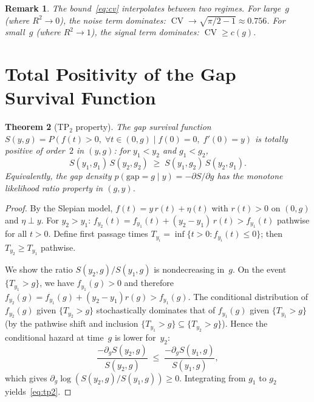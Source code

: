 \documentclass[11pt]{article}
\newtheorem{theorem}{Theorem}
\newtheorem{remark}[theorem]{Remark}
\DeclareMathOperator{\CV}{CV}
\begin{document}
\begin{remark}\label{rem:interpolation}
The bound~\eqref{eq:cv} interpolates between two regimes.
For large~$g$ (where $R^2 \to 0$), the noise term dominates:
$\CV \to \sqrt{\pi/2 - 1} \approx 0.756$.
For small~$g$ (where $R^2 \to 1$), the signal term dominates:
$\CV \geq c(g)$.
\end{remark}


\section{Total Positivity of the Gap Survival Function}\label{sec:tp2}

\begin{theorem}[TP$_2$ property]\label{thm:tp2}
The gap survival function
$S(y, g) = P(f(t) > 0,\; \forall t \in (0,g) \mid f(0) = 0,\; f'(0) = y)$
is totally positive of order~$2$ in $(y, g)$:
for $y_1 < y_2$ and $g_1 < g_2$,
\begin{equation}\label{eq:tp2}
S(y_1, g_1)\,S(y_2, g_2) \;\geq\; S(y_1, g_2)\,S(y_2, g_1).
\end{equation}
Equivalently, the gap density $p(\mathrm{gap} = g \mid y) = -\partial S/\partial g$
has the monotone likelihood ratio property in $(g, y)$.
\end{theorem}

\begin{proof}
By the Slepian model, $f(t) = y\,r(t) + \eta(t)$ with $r(t) > 0$ on $(0,g)$
and $\eta \perp y$.
For $y_2 > y_1$: $f_{y_2}(t) = f_{y_1}(t) + (y_2 - y_1)\,r(t) > f_{y_1}(t)$
pathwise for all $t > 0$.
Define first passage times $T_{y_i} = \inf\{t > 0 : f_{y_i}(t) \leq 0\}$;
then $T_{y_2} \geq T_{y_1}$ pathwise.

We show the ratio $S(y_2, g)/S(y_1, g)$ is nondecreasing in~$g$.
On the event $\{T_{y_1} > g\}$, we have $f_{y_1}(g) > 0$ and therefore
$f_{y_2}(g) = f_{y_1}(g) + (y_2 - y_1)r(g) > f_{y_1}(g)$.
The conditional distribution of $f_{y_2}(g)$ given $\{T_{y_2} > g\}$
stochastically dominates that of $f_{y_1}(g)$ given $\{T_{y_1} > g\}$
(by the pathwise shift and inclusion $\{T_{y_1} > g\} \subseteq \{T_{y_2} > g\}$).
Hence the conditional hazard at time~$g$ is lower for~$y_2$:
\[
\frac{-\partial_g S(y_2, g)}{S(y_2, g)} \;\leq\;
\frac{-\partial_g S(y_1, g)}{S(y_1, g)},
\]
which gives $\partial_g \log(S(y_2,g)/S(y_1,g)) \geq 0$.
Integrating from $g_1$ to $g_2$ yields~\eqref{eq:tp2}.
\end{proof}
\end{document}

